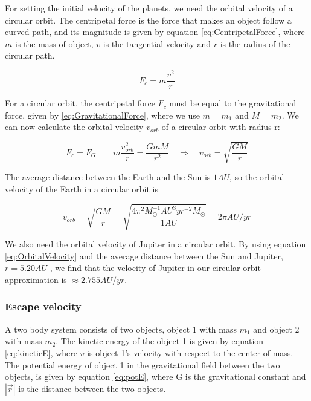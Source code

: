 \documentclass[norsk,a4paper,12pt]{article}
\begin{document}
For setting the initial velocity of the planets, we need the orbital velocity of a circular orbit. The centripetal force is the force that makes an object follow a curved path, and its magnitude is given by equation \ref{eq:CentripetalForce}, where $m$ is the mass of object, $v$ is the tangential velocity and $r$ is the radius of the circular path. 

\begin{equation}
     F_c = m \frac{v^2}{r}
     \label{eq:CentripetalForce}
\end{equation}

For a circular orbit, the centripetal force $F_c$ must be equal to the gravitational force, given by \ref{eq:GravitationalForce}, where we use $m = m_1$ and $M =m_2$. We can now calculate the orbital velocity $v_{orb}$ of a circular orbit with radius r:

\begin{equation}
    F_c = F_G \quad \quad m \frac{v_{orb}^2}{r} = \frac{GmM}{r^2} \quad \Rightarrow \quad v_{orb} = \sqrt{\frac{GM}{r}}
    \label{eq:OrbitalVelocity}
\end{equation}

The average distance between the Earth and the Sun is $1 AU$, so the orbital velocity of the Earth in a circular orbit is

\begin{equation}
v_{orb} = \sqrt{\frac{GM}{r}} = \sqrt{\frac{ 4\pi^2 M_{\odot} ^{-1} AU^3 yr^{-2} M_{\odot}}{1 AU}} = 2\pi AU/yr 
\label{eq:AnalyticVel}
\end{equation}

We also need the orbital velocity of Jupiter in a circular orbit. By using equation \ref{eq:OrbitalVelocity} and the average distance between the Sun and Jupiter, $r = 5.20 AU$ \cite{Project_text}, we find that the velocity of Jupiter in our circular orbit approximation is $\approx 2.755 AU/yr$.

\subsubsection{Escape velocity}
A two body system consists of two objects, object 1 with mass $m_1$ and object 2 with mass $m_2$. The kinetic energy of the object 1 is given by equation \ref{eq:kineticE}, where $v$ is object 1's velocity with respect to the center of mass. The potential energy of object 1 in the gravitational field between the two objects, is given by equation \ref{eq:potE}, where G is the gravitational constant and $|\vec{r}|$ is the distance between the two objects. 
\end{document}
